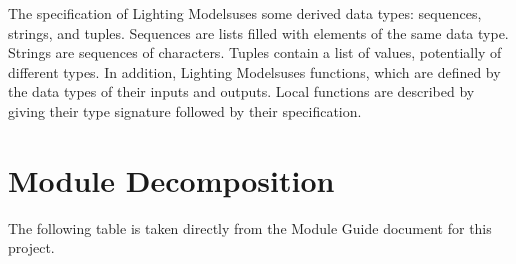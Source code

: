 \documentclass[12pt, titlepage]{article}
\newcommand{\progname}{Lighting Models}
\begin{document}
\noindent
The specification of \progname uses some derived data types: sequences, 
strings, and tuples. Sequences are lists filled with elements of the same data 
type. Strings
are sequences of characters. Tuples contain a list of values, potentially of
different types. In addition, \progname uses functions, which
are defined by the data types of their inputs and outputs. Local functions are
described by giving their type signature followed by their specification.

\section{Module Decomposition}

The following table is taken directly from the Module Guide document for this project.
\end{document}
